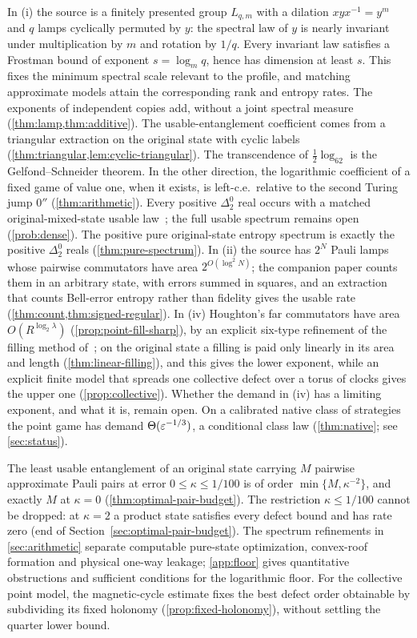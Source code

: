 In (i) the source is a finitely presented group $L_{q,m}$ with a dilation $xyx^{-1}=y^m$ and $q$ lamps cyclically permuted by $y$:
the spectral law of $y$ is nearly invariant under multiplication by $m$ and rotation by $1/q$. Every invariant law satisfies a
Frostman bound of exponent $s=\log_mq$, hence has dimension at least $s$. This fixes the minimum spectral scale relevant to the
profile, and matching approximate models attain the corresponding rank and entropy rates. The exponents of independent copies
add, without a joint spectral measure (\cref{thm:lamp,thm:additive}). The usable-entanglement
coefficient comes from a triangular extraction on the original state with cyclic labels (\cref{thm:triangular,lem:cyclic-triangular}).
The transcendence of $\frac12\log_62$ is the Gelfond--Schneider theorem. In the other direction, the logarithmic coefficient of a fixed
game of value one, when it exists, is left-c.e.\ relative to the second Turing jump $0''$ (\cref{thm:arithmetic}). Every positive $\Delta^0_2$ real occurs with a matched original-mixed-state usable law~\cite[Theorem~16.6 and Corollary~16.7]{DM-U3}; the full usable spectrum remains open (\cref{prob:dense}). The positive pure original-state entropy spectrum is exactly the positive $\Delta^0_2$ reals (\cref{thm:pure-spectrum}). In (ii) the source has $2^N$ Pauli
lamps whose pairwise commutators have area $2^{O(\log^2N)}$; the companion paper counts them in an arbitrary state, with errors
summed in squares, and an extraction that counts Bell-error entropy rather than fidelity gives the usable rate
(\cref{thm:count,thm:signed-regular}). In (iv)
Houghton's far commutators have area $O(R^{\log_2\lambda})$ (\cref{prop:point-fill-sharp}), by an explicit six-type refinement of the filling method of~\cite{DM-H3}; on the original state a filling is paid only
linearly in its area and length (\cref{thm:linear-filling}), and this gives the lower exponent, while an explicit finite model
that spreads one collective defect over a torus of clocks gives the upper one (\cref{prop:collective}). Whether the demand in
(iv) has a limiting exponent, and what it is, remain open. On a calibrated native class of strategies the point game has demand $\Theta(\varepsilon^{-1/3})$, a conditional class
law (\cref{thm:native}; see \cref{sec:status}).

The least usable entanglement of an original state carrying $M$ pairwise approximate Pauli pairs at error $0\le\kappa\le1/100$ is of order $\min\{M,\kappa^{-2}\}$, and exactly $M$ at $\kappa=0$ (\cref{thm:optimal-pair-budget}). The restriction $\kappa\le1/100$ cannot be dropped: at $\kappa=2$ a product state satisfies every defect bound and has rate zero (end of Section~\ref{sec:optimal-pair-budget}). The spectrum refinements in \cref{sec:arithmetic} separate computable pure-state optimization, convex-roof formation and physical one-way leakage; \cref{app:floor} gives quantitative obstructions and sufficient conditions for the logarithmic floor. For the collective point model, the magnetic-cycle estimate fixes the best defect order obtainable by subdividing its fixed holonomy (\cref{prop:fixed-holonomy}), without settling the quarter lower bound.

